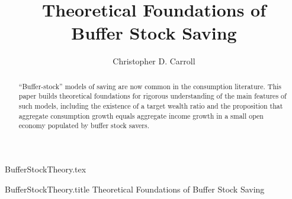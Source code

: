\documentclass[titlepage]{\econtex}\providecommand{\texname}{BufferStockTheory}%
\newcommand{\onlyinsubfile}[1]{#1}\newcommand{\notinsubfile}[1]{} %
\begin{document}

\renewcommand{\onlyinsubfile}[1]{}\renewcommand{\notinsubfile}[1]{#1} %

\hfill{\tiny \texname.tex}

\begin{verbatimwrite}{\texname.title}
Theoretical Foundations of Buffer Stock Saving
\end{verbatimwrite}


\title{Theoretical Foundations of \\ Buffer Stock Saving}

\author{Christopher D. Carroll\authNum}






\begin{abstract}
  ``Buffer-stock'' models of saving are now common in the
  consumption literature.  This paper builds theoretical foundations
  for rigorous understanding of the main features of such models,
  including the existence of a target wealth ratio and the proposition
  that aggregate consumption growth equals aggregate income growth in
  a small open economy populated by buffer stock savers.
\end{abstract}
\end{document}

